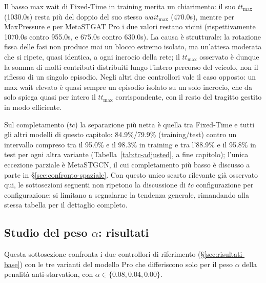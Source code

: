 Il basso max wait di Fixed-Time in training merita un chiarimento: il suo
$tt_{\max}$ (1030.0s) resta più del doppio del suo stesso $wait_{\max}$
(470.0s), mentre per MaxPressure e per MetaSTGAT Pro i due valori restano
vicini (rispettivamente 1070.0s contro 955.0s, e 675.0s contro 630.0s). La
causa è strutturale: la rotazione fissa delle fasi non produce mai un
blocco estremo isolato, ma un'attesa moderata che si ripete, quasi
identica, a ogni incrocio della rete; il $tt_{\max}$ osservato è dunque la
somma di molti contributi distribuiti lungo l'intero percorso del
veicolo, non il riflesso di un singolo episodio. Negli altri due
controllori vale il caso opposto: un max wait elevato è quasi sempre un
episodio isolato su un solo incrocio, che da solo spiega quasi per intero
il $tt_{\max}$ corrispondente, con il resto del tragitto gestito in modo
efficiente.

Sul completamento ($tc$) la separazione più netta è quella tra Fixed-Time
e tutti gli altri modelli di questo capitolo: 84.9\%/79.9\%
(training/test) contro un intervallo compreso tra il 95.0\% e il 98.3\% in
training e tra l'88.9\% e il 95.8\% in test per ogni altra variante
(Tabella~\ref{tab:tc-adjusted}, a fine capitolo); l'unica
eccezione parziale è MetaSTGCN, il cui completamento più basso è discusso
a parte in §\ref{sec:confronto-spaziale}. Con questo unico scarto
rilevante già osservato qui, le sottosezioni seguenti non ripetono la
discussione di $tc$ configurazione per configurazione: si limitano a
segnalarne la tendenza generale, rimandando alla stessa tabella per il
dettaglio completo.

\subsection{Studio del peso \texorpdfstring{$\alpha$}{alpha}: risultati}
\label{sec:risultati-alpha}
\label{sec:equita-alpha}

Questa sottosezione confronta i due controllori di riferimento
(§\ref{sec:risultati-base}) con le tre varianti del modello Pro che
differiscono solo per il peso $\alpha$ della penalità anti-starvation,
con $\alpha \in \{0.08, 0.04, 0.00\}$.

